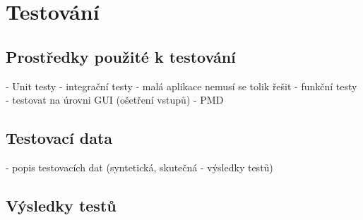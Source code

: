 \chapter{Testování}

	\section{Prostředky použité k testování}
		 - Unit testy 
		 - integrační testy - malá aplikace nemusí se tolik řešit
		 - funkční testy - testovat na úrovni GUI (ošetření vstupů)
		 - PMD
	
	\section{Testovací data}
		 - popis testovacích dat (syntetická, skutečná - výsledky testů)
	\section{Výsledky testů}
